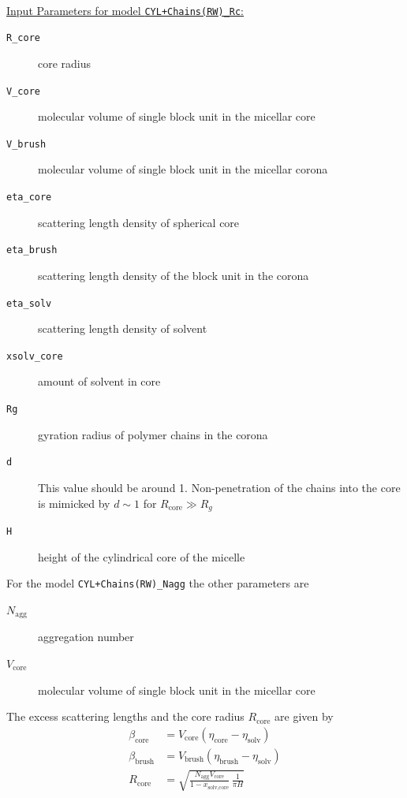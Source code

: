 \hspace{1pt}\\
\uline{Input Parameters for model \texttt{CYL+Chains(RW)\_Rc}:}
\begin{description}
\item[\texttt{R\_core}] core radius
\item[\texttt{V\_core}] molecular volume of single block unit in the micellar core
\item[\texttt{V\_brush}]  molecular volume of single block unit in the micellar corona
\item[\texttt{eta\_core}] scattering length density of spherical core
\item[\texttt{eta\_brush}] scattering length density of the block unit in the corona
\item[\texttt{eta\_solv}] scattering length density of solvent
\item[\texttt{xsolv\_core}] amount of solvent in core
\item[\texttt{Rg}] gyration radius of polymer chains in the corona
\item[\texttt{d}] This value should be around 1. Non-penetration of the chains
into the core is mimicked by $d\sim 1$ for $R_\text{core}\gg R_g$
\item[\texttt{H}] height of the cylindrical core of the micelle
\end{description}

\vspace{3mm}

\noindent
For the model \texttt{CYL+Chains(RW)\_Nagg} the other parameters are
\begin{description}
\item[$N_\text{agg}$] aggregation number
\item[$V_\text{core}$] molecular volume of single block unit in the micellar core
\end{description}
The excess scattering lengths and the core radius $R_\text{core}$ are given by
\begin{align}
\beta_\text{core}  &= V_\text{core}  (\eta_\text{core} -\eta_\text{solv}) \\
\beta_\text{brush} &= V_\text{brush} (\eta_\text{brush}-\eta_\text{solv}) \\
R_\text{core} &= \sqrt{ \frac{N_\text{agg} V_\text{core}}{1-x_\text{solv,core}}
                \, \frac{1}{\pi H}}
\end{align}



